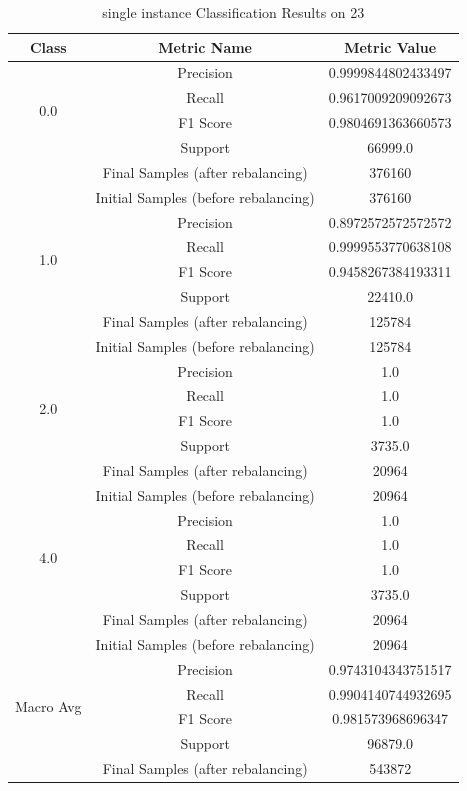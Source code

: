 \begin{longtable}{|c|c|c|}
\caption{single instance Classification Results on 23} \label{tab:23_single_instance_classifiers_results} \\
\hline
Class & Metric Name & Metric Value \\
\hline
\multirow{4}{*}{0.0} & Precision & 0.9999844802433497 \\
 & Recall & 0.9617009209092673 \\
 & F1 Score & 0.9804691363660573 \\
 & Support & 66999.0 \\
 & Final Samples (after rebalancing) & 376160 \\
 & Initial Samples (before rebalancing) & 376160 \\
\hline
\multirow{4}{*}{1.0} & Precision & 0.8972572572572572 \\
 & Recall & 0.9999553770638108 \\
 & F1 Score & 0.9458267384193311 \\
 & Support & 22410.0 \\
 & Final Samples (after rebalancing) & 125784 \\
 & Initial Samples (before rebalancing) & 125784 \\
\hline
\multirow{4}{*}{2.0} & Precision & 1.0 \\
 & Recall & 1.0 \\
 & F1 Score & 1.0 \\
 & Support & 3735.0 \\
 & Final Samples (after rebalancing) & 20964 \\
 & Initial Samples (before rebalancing) & 20964 \\
\hline
\multirow{4}{*}{4.0} & Precision & 1.0 \\
 & Recall & 1.0 \\
 & F1 Score & 1.0 \\
 & Support & 3735.0 \\
 & Final Samples (after rebalancing) & 20964 \\
 & Initial Samples (before rebalancing) & 20964 \\
\hline
\multirow{4}{*}{Macro Avg} & Precision & 0.9743104343751517 \\
 & Recall & 0.9904140744932695 \\
 & F1 Score & 0.981573968696347 \\
 & Support & 96879.0 \\
 & Final Samples (after rebalancing) & 543872 \\

\end{longtable}
